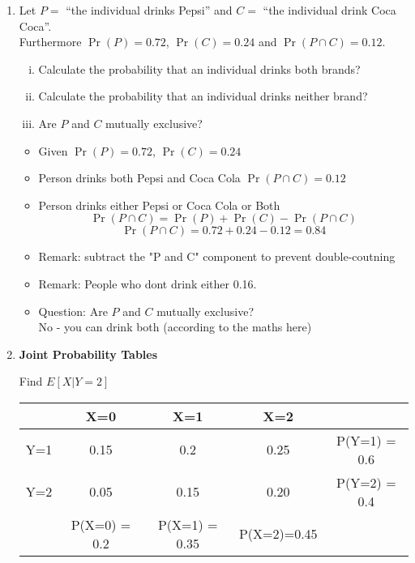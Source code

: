 \documentclass[a4paper,12pt]{article}
\begin{document}
\begin{enumerate}
\item Let $P = $ ``the individual drinks Pepsi'' and $C = $ ``the individual drink Coca Coca''.\\ Furthermore $\Pr(P) = 0.72$, $\Pr(C) = 0.24$ and $\Pr(P \cap C) = 0.12$.\\[-0.2cm]

\begin{enumerate}[(i)]
\item Calculate the probability that an individual drinks both brands? 
\item Calculate the probability that an individual drinks neither brand? 
\item Are $P$ and $C$ mutually exclusive? 
\end{enumerate}

\begin{framed}


\begin{itemize}
\item Given $\Pr(P) = 0.72$, $\Pr(C) = 0.24$
\item Person drinks both Pepsi and Coca Cola $\Pr(P \cap C) = 0.12$
\item Person drinks either Pepsi or Coca Cola  or Both
\[\Pr(P \cap C) = \Pr(P) +  \Pr(C)   - \Pr(P \cap C) \]
\[\Pr(P \cap C) = 0.72 +  0.24  - 0.12 = 0.84\]
\item Remark: subtract the "P and C" component to prevent double-coutning
\item Remark: People who dont drink either 0.16.
\item Question: Are $P$ and $C$ mutually exclusive?
\\ No - you can drink both (according to the maths here)
\end{itemize}
\end{framed}

\item \textbf{Joint Probability Tables}

Find $E[X|Y=2]$

\begin{tabular}{ccccc}
& X=0  & X=1  & X=2  &              \\ \hline
Y=1 & 0.15 & 0.2  & 0.25 & P(Y=1) = 0.6 \\ \hline
Y=2 & 0.05 & 0.15 & 0.20 & P(Y=2) = 0.4 \\ \hline
& P(X=0) = 0.2  & P(X=1) = 0.35  & P(X=2)=0.45  &              \\ \hline
\end{tabular}



\end{enumerate}
\end{document}
